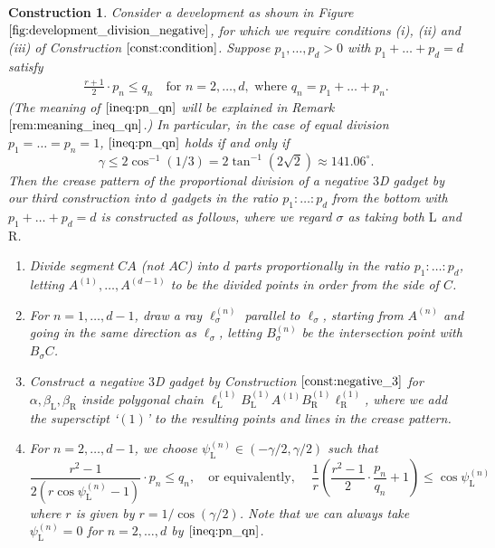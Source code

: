 \documentclass[11pt]{amsart}
\newtheorem{construction}[theorem]{Construction}
\numberwithin{equation}{section}
\numberwithin{theorem}{section}
\newcommand{\Lt}{\ensuremath{\mathrm{L}}}
\newcommand{\Rt}{\ensuremath{\mathrm{R}}}
\begin{document}
\begin{construction}\label{const:division_new}\rm
Consider a development as shown in Figure $\ref{fig:development_division_negative}$, 
for which we require conditions (i), (ii) and (iii) of Construction $\ref{const:condition}$.
Suppose $p_1,\dots ,p_d>0$ with $p_1+\dots +p_d=d$ satisfy
\begin{equation}\label{ineq:pn_qn}
\begin{aligned}
\frac{r+1}{2}\cdot p_n\leqslant q_n\quad\text{for }n=2,\dots ,d,\text{ where }q_n=p_1+\dots +p_n.
\end{aligned}
\end{equation}
(The meaning of $\eqref{ineq:pn_qn}$ will be explained in Remark $\ref{rem:meaning_ineq_qn}$.)
In particular, in the case of equal division $p_1=\dots =p_n=1$, $\eqref{ineq:pn_qn}$ holds if and only if
\begin{equation*}
\gamma\leqslant 2\cos^{-1}(1/3)=2\tan^{-1}(2\sqrt{2})\approx 141.06^\circ .
\end{equation*}
Then the crease pattern of the proportional division of a negative $3$D gadget by our third construction
into $d$ gadgets in the ratio $p_1:\dots :p_d$ from the bottom with $p_1+\dots +p_d=d$ is constructed as follows,
where we regard $\sigma$ as taking both $\Lt$ and $\Rt$.
\begin{enumerate}
\item Divide segment $CA$ (not $AC$) into $d$ parts proportionally in the ratio $p_1:\dots :p_d$,
letting $A^{(1)},\dots ,A^{(d-1)}$ to be the divided points in order from the side of $C$.
\item For $n=1,\dots ,d-1$, draw a ray $\ell_\sigma^{(n)}$ parallel to $\ell_\sigma$, starting from $A^{(n)}$ and going in the same direction as $\ell_\sigma$,
letting $B_\sigma^{(n)}$ be the intersection point with $B_\sigma C$.
\item Construct a negative $3$D gadget by Construction $\ref{const:negative_3}$ for $\alpha ,\beta_\Lt ,\beta_\Rt$
inside polygonal chain $\ell_\Lt^{(1)}B_\Lt^{(1)}A^{(1)}B_\Rt^{(1)}\ell_\Rt^{(1)}$,
where we add the supersctipt `$(1)$' to the resulting points and lines in the crease pattern.
\item For $n=2,\dots ,d-1$, we choose $\psi_\Lt^{(n)}\in (-\gamma/2,\gamma /2)$ such that
\begin{equation}\label{ineq:psi_n}
\frac{r^2-1}{2(r\cos\psi_\Lt^{(n)}-1)}\cdot p_n\leqslant q_n, \quad\text{or equivalently, }\quad
\frac{1}{r}\left(\frac{r^2-1}{2}\cdot\frac{p_n}{q_n}+1\right)\leqslant\cos\psi_\Lt^{(n)}
\end{equation}
where $r$ is given by $r=1/\cos (\gamma /2)$.
Note that we can \emph{always} take $\psi_\Lt^{(n)}=0$ for $n=2,\dots ,d$ by $\eqref{ineq:pn_qn}$.


\end{enumerate}
\end{construction}
\end{document}
